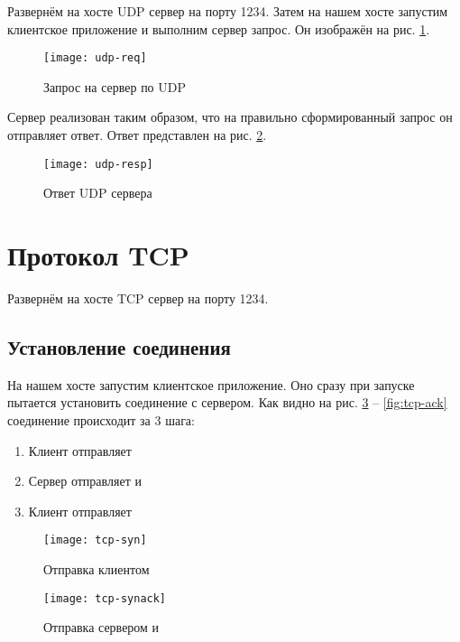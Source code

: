 Развернём на хосте  UDP сервер на порту 1234. Затем на нашем хосте  запустим клиентское приложение и выполним сервер запрос. Он изображён на рис. \ref{fig:udp-req}.

\begin{figure}[H]
	\centering
	\texttt{[image: udp-req]}
	\caption{Запрос на сервер по UDP}
	\label{fig:udp-req}
\end{figure}

Сервер реализован таким образом, что на правильно сформированный запрос он отправляет ответ. Ответ представлен на рис. \ref{fig:udp-resp}.

\begin{figure}[H]
	\centering
	\texttt{[image: udp-resp]}
	\caption{Ответ UDP сервера}
	\label{fig:udp-resp}
\end{figure}

\section{Протокол TCP}

Развернём на хосте  TCP сервер на порту 1234. 

\subsection{Установление соединения}

На нашем хосте  запустим клиентское приложение. Оно сразу при запуске пытается установить соединение с сервером. Как видно на рис. \ref{fig:tcp-syn} -- \ref{fig:tcp-ack} соединение происходит за 3 шага:

\begin{enumerate}
	\item Клиент отправляет 
	\item Сервер отправляет  и 
	\item Клиент отправляет 
\end{enumerate}

\begin{figure}[H]
	\centering
	\texttt{[image: tcp-syn]}
	\caption{Отправка клиентом }
	\label{fig:tcp-syn}
\end{figure}

\begin{figure}[H]
	\centering
	\texttt{[image: tcp-synack]}
	\caption{Отправка сервером  и }
	\label{fig:tcp-synack}
\end{figure}

